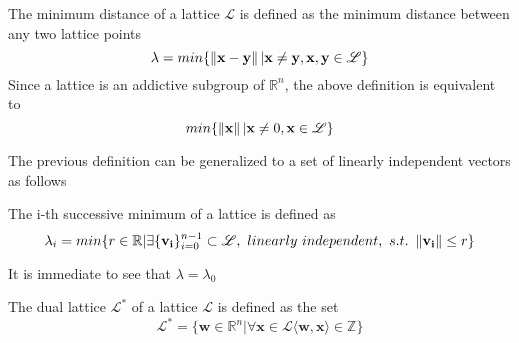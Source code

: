 \begin{definition}
The minimum distance of a lattice $\mathscr{L}$ is defined as the minimum distance between any two lattice points
\begin{equation*}
\lambda = min\{\left\lVert \mathbf{x}-\mathbf{y} \right\rVert|\mathbf{x}\ne \mathbf{y}, \mathbf{x},\mathbf{y}\in\mathscr{L}\}
\end{equation*}
Since a lattice is an addictive subgroup of $\mathbb{R}^n$, the above definition is equivalent to
\begin{equation*}
min\{\left\lVert \mathbf{x} \right\rVert|\mathbf{x}\ne0, \mathbf{x}\in\mathscr{L}\}
\end{equation*}
\end{definition}

The previous definition can be generalized to a set of linearly independent vectors as follows
\begin{definition}
The i-th successive minimum of a lattice is defined as 
\begin{equation*}
\lambda_i = min\{r \in \mathbb{R}|\exists \{\mathbf{v_i}\}_{i=0}^{n-1} \subset \mathscr{L},\text{ }linearly\text{ }independent,\text{ }s.t.\text{ }\left\lVert \mathbf{v_i} \right\rVert\leq r\}
\end{equation*}
\end{definition}

\begin{remark}
It is immediate to see that $\lambda=\lambda_0$
\end{remark}

\begin{definition}
The dual lattice $\mathscr{L}^*$ of a lattice $\mathscr{L}$ is defined as the set
\begin{equation*}
\mathscr{L}^*=\{\mathbf{w}\in\mathbb{R}^n|\forall\mathbf{x}\in\mathscr{L}\langle\mathbf{w},\mathbf{x}\rangle\in\mathbb{Z}\}
\end{equation*}
\end{definition} 

